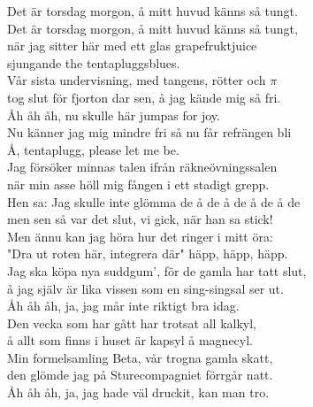 \documentclass[a6paper,10pt]{article}
\begin{document}
\setlength{\oddsidemargin}{-0.47in}
\noindent
\begin{center}
\end{center}
\begin{lyrics}
Det är torsdag morgon, å mitt huvud känns så tungt. \\
Det är torsdag morgon, å mitt huvud känns så tungt, \\
när jag sitter här med ett glas grapefruktjuice \\
sjungande the tentapluggsblues. 
\vspace{5pt} \\
Vår sista undervisning, med tangens, rötter och $\pi$ \\
tog slut för fjorton dar sen, å jag kände mig så fri. \\
Åh åh åh, nu skulle här jumpas for joy. \\
Nu känner jag mig mindre fri så nu får refrängen bli \\
Å, tentaplugg, please let me be. 
\vspace{5pt} \\
Jag försöker minnas talen ifrån räkneövningssalen \\
när min asse höll mig fången i ett stadigt grepp. \\
Hen sa: Jag skulle inte glömma de å de å de å de å de \\
men sen så var det slut, vi gick, när han sa stick! \\
Men ännu kan jag höra hur det ringer i mitt öra: \\
"Dra ut roten här, integrera där" häpp, häpp, häpp. 
\vspace{5pt} \\
Jag ska köpa nya suddgum', för de gamla har tatt slut, \\
å jag själv är lika vissen som en sing-singsal ser ut. \\
Åh åh åh, ja, jag mår inte riktigt bra idag. \\
Den vecka som har gått har trotsat all kalkyl, \\
å allt som finns i huset är kapsyl å magnecyl. 
\vspace{5pt} \\
Min formelsamling Beta, vår trogna gamla skatt, \\
den glömde jag på Sturecompagniet förrgår natt.  \\
Åh åh åh, ja, jag hade väl druckit, kan man tro. \\

\end{lyrics}
\end{document}
